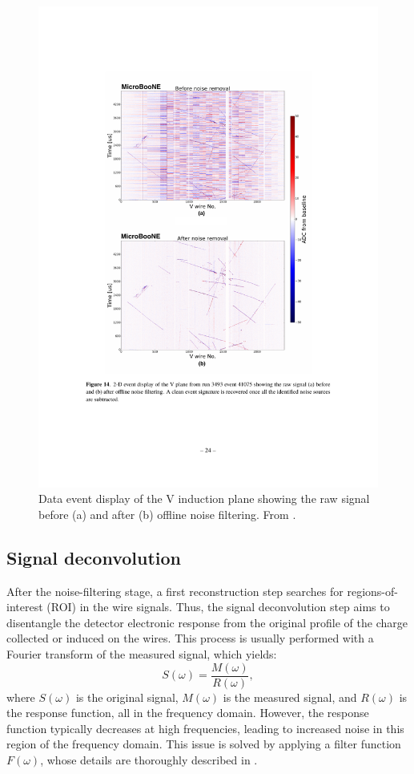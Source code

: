 \begin{figure}[htbp]
    \centering
    \includegraphics[width=0.75\linewidth]{figures/evd_noise.pdf}
    \caption{Data event display of the V induction plane showing the raw signal before (a) and after (b) offline noise filtering. From \cite{Acciarri:2017sde}.}
    \label{fig:evd_noise}
\end{figure}

\subsection{Signal deconvolution}
After the noise-filtering stage, a first reconstruction step searches for regions-of-interest (ROI) in the wire signals. Thus, the signal deconvolution step aims to disentangle the detector electronic response from the original profile of the charge collected or induced on the wires. This process is usually performed with a Fourier transform of the measured signal, which yields:
\begin{equation}
    S(\omega) = \frac{M(\omega)}{R(\omega)},
\end{equation}
where $S(\omega)$ is the original signal, $M(\omega)$ is the measured signal, and $R(\omega)$ is the response function, all in the frequency domain. However, the response function typically decreases at high frequencies, leading to increased noise in this region of the frequency domain. This issue is solved by applying a filter function $F(\omega)$, whose details are thoroughly described in \cite{Adams:2018dra}. 

